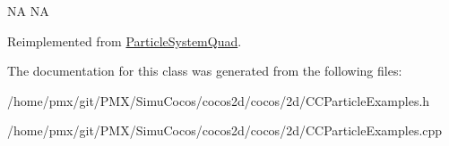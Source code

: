 NA  NA 

Reimplemented from \hyperlink{classParticleSystemQuad_ae5420007b57e909c05e7476a54fbfbe9}{Particle\+System\+Quad}.



The documentation for this class was generated from the following files\+:\begin{DoxyCompactItemize}
\item 
/home/pmx/git/\+P\+M\+X/\+Simu\+Cocos/cocos2d/cocos/2d/C\+C\+Particle\+Examples.\+h\item 
/home/pmx/git/\+P\+M\+X/\+Simu\+Cocos/cocos2d/cocos/2d/C\+C\+Particle\+Examples.\+cpp\end{DoxyCompactItemize}
